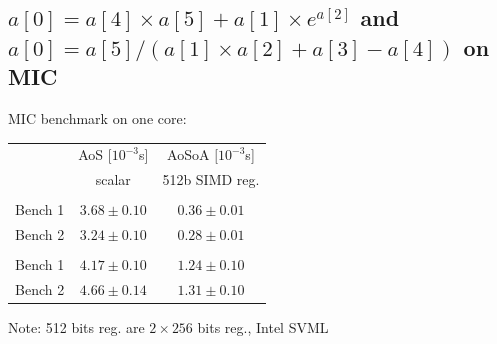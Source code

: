 \documentclass{beamer}
\begin{document}
\subsection*{$a[0] = a[4] \times a[5] + a[1] \times e^{a[2]}$ and $a[0] = a[5]/(a[1] \times a[2]+a[3]-a[4])$ on MIC}
\begin{frame}[fragile]
\centering
MIC benchmark on one core:
\vspace{0.5cm}

\begin{tabular}{ c c  |  c }
      & AoS $[10^{-3}$s] & AoSoA $[10^{-3}$s]\\
                            & scalar & 512b SIMD reg. \\                            
                           \hline
        \color{C0}{float}                    &  &  \\
   Bench 1  & $3.68\pm0.10$ & \cellcolor{C2}$0.36\pm0.01$\\
   Bench 2  & $3.24\pm0.10$ & \cellcolor{C2}$0.28\pm0.01$  \\
      \hline
        \color{C0}{double}                    &  &  \\
   Bench 1  & $4.17\pm0.10$ & \cellcolor{C2}$1.24\pm0.10$ \\
   Bench 2  & $4.66\pm0.14$ &\cellcolor{C2} $1.31\pm0.10$  \\
\hline
\end{tabular}
\vspace{0.5cm}

Note: 512 bits reg. are $2 \times 256$ bits reg., Intel SVML



\end{frame}

\end{document}
